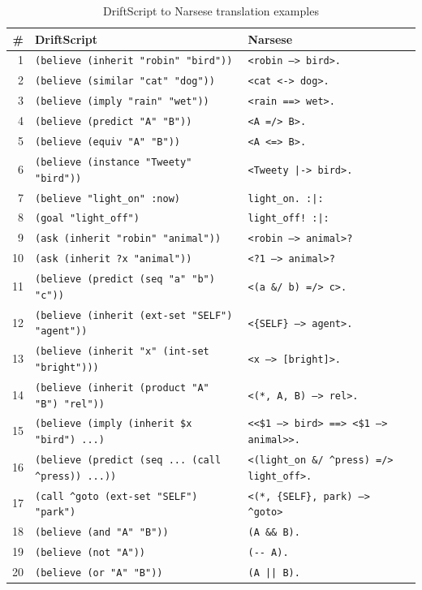 \documentclass[11pt,a4paper]{article}
\begin{document}
\begin{table}[h]
\centering
\caption{DriftScript to Narsese translation examples}
\label{tab:translations}
\footnotesize
\begin{tabular}{rll}
\toprule
\textbf{\#} & \textbf{DriftScript} & \textbf{Narsese} \\
\midrule
1  & \texttt{(believe (inherit "robin" "bird"))} & \texttt{<robin --> bird>.} \\
2  & \texttt{(believe (similar "cat" "dog"))} & \texttt{<cat <-> dog>.} \\
3  & \texttt{(believe (imply "rain" "wet"))} & \texttt{<rain ==> wet>.} \\
4  & \texttt{(believe (predict "A" "B"))} & \texttt{<A =/> B>.} \\
5  & \texttt{(believe (equiv "A" "B"))} & \texttt{<A <=> B>.} \\
6  & \texttt{(believe (instance "Tweety" "bird"))} & \texttt{<Tweety |-> bird>.} \\
7  & \texttt{(believe "light\_on" :now)} & \texttt{light\_on. :|:} \\
8  & \texttt{(goal "light\_off")} & \texttt{light\_off! :|:} \\
9  & \texttt{(ask (inherit "robin" "animal"))} & \texttt{<robin --> animal>?} \\
10 & \texttt{(ask (inherit ?x "animal"))} & \texttt{<?1 --> animal>?} \\
11 & \texttt{(believe (predict (seq "a" "b") "c"))} & \texttt{<(a \&/ b) =/> c>.} \\
12 & \texttt{(believe (inherit (ext-set "SELF") "agent"))} & \texttt{<\{SELF\} --> agent>.} \\
13 & \texttt{(believe (inherit "x" (int-set "bright")))} & \texttt{<x --> [bright]>.} \\
14 & \texttt{(believe (inherit (product "A" "B") "rel"))} & \texttt{<(*, A, B) --> rel>.} \\
15 & \texttt{(believe (imply (inherit \$x "bird") ...)} & \texttt{<<\$1 --> bird> ==> <\$1 --> animal>>.} \\
16 & \texttt{(believe (predict (seq ... (call \^{}press)) ...))} & \texttt{<(light\_on \&/ \^{}press) =/> light\_off>.} \\
17 & \texttt{(call \^{}goto (ext-set "SELF") "park")} & \texttt{<(*, \{SELF\}, park) --> \^{}goto>} \\
18 & \texttt{(believe (and "A" "B"))} & \texttt{(A \&\& B).} \\
19 & \texttt{(believe (not "A"))} & \texttt{(-{}- A).} \\
20 & \texttt{(believe (or "A" "B"))} & \texttt{(A || B).} \\
\bottomrule
\end{tabular}
\end{table}
\end{document}
